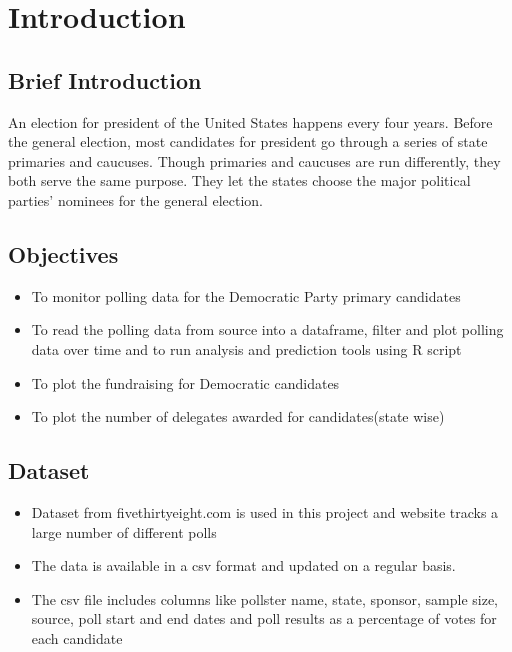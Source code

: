 \section{Introduction}
\subsection{Brief Introduction}
An election for president of the United States happens every four years. Before the general election, most candidates for president go through a series of state primaries and caucuses. Though primaries and caucuses are run differently, they both serve the same purpose. They let the states choose the major political parties’ nominees for the general election\cite{usagov}. 

\subsection{Objectives}
\begin{itemize}
    \item To monitor polling data for the Democratic Party primary candidates
    \item To read the polling data from source into a dataframe, filter and plot polling data over time and to run analysis and prediction tools using R script 
    \item To plot the fundraising for Democratic candidates
    \item To plot the number of delegates awarded for candidates(state wise)
\end{itemize}

\subsection{Dataset}
\begin{itemize}
    \item Dataset from fivethirtyeight.com\cite{jr._malone_skelley_koerth_paine_dubin_sawchik_rakich} is used in this project and website tracks a large number of different polls
    \item  The data is available in a csv format and updated on a regular basis. 
    \item The csv file includes columns like pollster name, state, sponsor, sample size, source, poll start and end dates and poll results as a percentage of votes for each candidate
\end{itemize}
